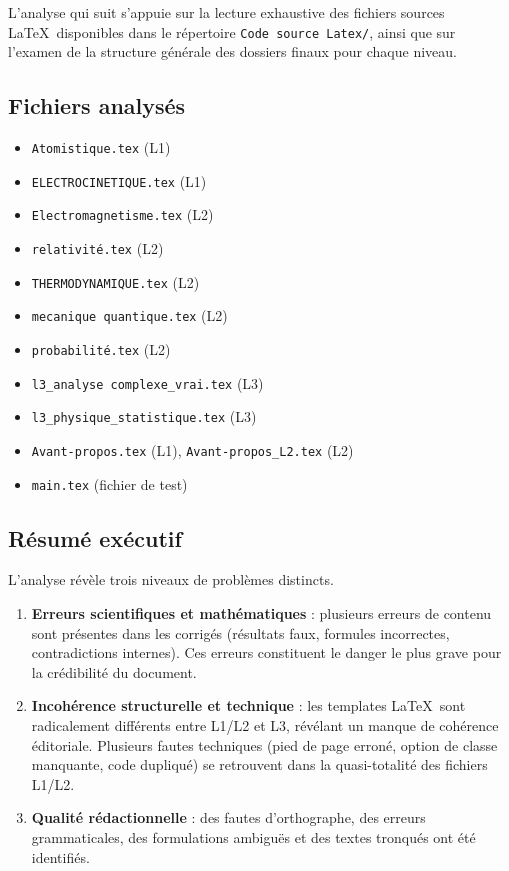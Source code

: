 \documentclass[12pt,a4paper]{article}
\newcommand{\fichier}[1]{\texttt{\small\color{Purple}#1}}
\begin{document}
L'analyse qui suit s'appuie sur la lecture exhaustive des fichiers sources \LaTeX\ disponibles dans le répertoire \fichier{Code source Latex/}, ainsi que sur l'examen de la structure générale des dossiers finaux pour chaque niveau.

\subsection{Fichiers analysés}

\begin{itemize}
  \item \fichier{Atomistique.tex} (L1)
  \item \fichier{ELECTROCINETIQUE.tex} (L1)
  \item \fichier{Electromagnetisme.tex} (L2)
  \item \fichier{relativité.tex} (L2)
  \item \fichier{THERMODYNAMIQUE.tex} (L2)
  \item \fichier{mecanique quantique.tex} (L2)
  \item \fichier{probabilité.tex} (L2)
  \item \fichier{l3\_analyse complexe\_vrai.tex} (L3)
  \item \fichier{l3\_physique\_statistique.tex} (L3)
  \item \fichier{Avant-propos.tex} (L1), \fichier{Avant-propos\_L2.tex} (L2)
  \item \fichier{main.tex} (fichier de test)
\end{itemize}

\subsection{Résumé exécutif}

L'analyse révèle trois niveaux de problèmes distincts.

\begin{enumerate}
  \item \textbf{Erreurs scientifiques et mathématiques} : plusieurs erreurs de contenu sont présentes dans les corrigés (résultats faux, formules incorrectes, contradictions internes). Ces erreurs constituent le danger le plus grave pour la crédibilité du document.
  \item \textbf{Incohérence structurelle et technique} : les templates \LaTeX\ sont radicalement différents entre L1/L2 et L3, révélant un manque de cohérence éditoriale. Plusieurs fautes techniques (pied de page erroné, option de classe manquante, code dupliqué) se retrouvent dans la quasi-totalité des fichiers L1/L2.
  \item \textbf{Qualité rédactionnelle} : des fautes d'orthographe, des erreurs grammaticales, des formulations ambiguës et des textes tronqués ont été identifiés.
\end{enumerate}
\end{document}
